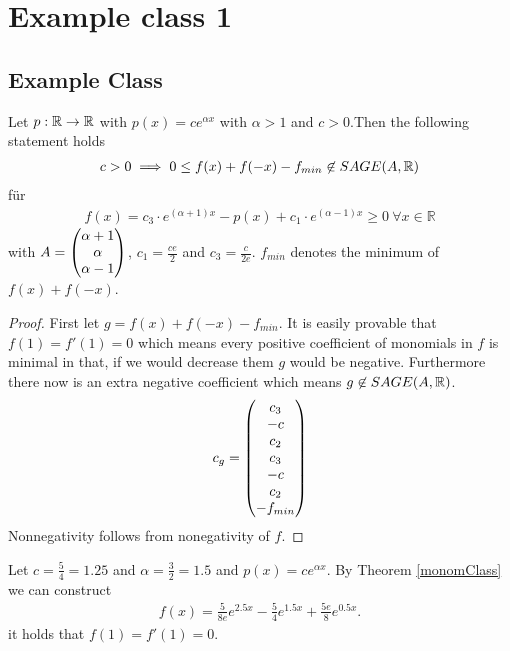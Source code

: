 \documentclass[./main.tex]{subfiles}
\begin{document}
\section{Example class 1}
\subsection{Example Class}
\begin{thm}
\label{monomClass}
Let $p: \mathbb{R} \rightarrow \mathbb{R}$ with $p(x) = c e^{\alpha x}$ with $\alpha >1$ and $c>0$.Then the following statement holds
\begin{align*}
c> 0 \implies  0 \leq f(x)+f(-x)-f_{min} \not\in SAGE(A,\mathbb{R})
\end{align*}
für
\begin{align*}
f(x) = c_3 \cdot e^{(\alpha +1) x} -p(x) + c_1 \cdot e^{(\alpha -1) x} \geq 0 \ \forall x \in \mathbb{R}
\end{align*}
with $A = \begin{pmatrix}\alpha +1 \\ \alpha \\ \alpha -1 \end{pmatrix}$, $c_1 = \frac {c e} {2} $ and $c_3 = \frac {c} {2 e}$. $f_{min}$ denotes the minimum of $f(x)+f(-x)$.
\begin{proof} First let $g=f(x)+f(-x)-f_{min}$. It is easily provable that  $f(1)=f'(1)=0$ which means every positive coefficient of monomials in $f$ is minimal in that, if we would decrease them $g$ would be negative. Furthermore there now is an extra negative coefficient which means $g\not \in SAGE(A,\mathbb{R})$. 
\begin{align*}
c_g=\begin{pmatrix}c_3\\-c\\c_2\\c_3\\-c\\c_2\\-f_{min}\end{pmatrix}
\end{align*}
Nonnegativity follows from nonegativity of $f$.
\end{proof}
\end{thm}
\begin{bsp}
Let $c=\frac 5 4 =1.25$ and $\alpha = \frac 3 2 = 1.5$ and $p(x)=ce^{\alpha x}$. By Theorem \ref{monomClass} we can construct
\begin{align*}
f(x)= \frac{5}{8e}e^{2.5x} -\frac 5 4 e^{1.5x}+\frac{5e}{8}e^{0.5x}.
\end{align*}
it holds that $f(1)=f'(1)=0$.
\end{bsp}
\end{document}
